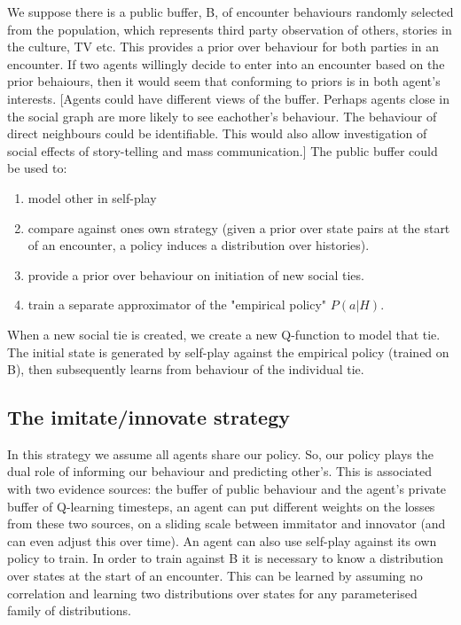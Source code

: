 \documentclass[a4paper]{report}
\begin{document}
We suppose there is a public buffer, B, of encounter behaviours randomly selected from the population, which represents third party observation of others, stories in the culture, TV etc. This provides a prior over behaviour for both parties in an encounter. If two agents willingly decide to enter into an encounter based on the prior behaiours, then it would seem that conforming to priors is in both agent's interests. [Agents could have different views of the buffer. Perhaps agents close in the social graph are more likely to see eachother's behaviour. The behaviour of direct neighbours could be identifiable. This would also allow investigation of social effects of story-telling and mass communication.] The public buffer could be used to:
\begin{enumerate}
	\item  model other in self-play
	
	\item compare against ones own strategy (given a prior over state pairs at the start of an encounter, a policy induces a distribution over histories). 
	
	\item provide a prior over behaviour on initiation of new social ties.
	
	\item train a separate approximator of the "empirical policy" $P(a|H)$. 
	
\end{enumerate}

When a new social tie is created, we create a new Q-function to model that tie. The initial state is generated by self-play against the empirical policy (trained on B), then subsequently learns from behaviour of the individual tie.

\subsection{The imitate/innovate strategy}

In this strategy we assume all agents share our policy. So, our policy plays the dual role of informing our behaviour and predicting other's. This is associated with two evidence sources: the buffer of public behaviour and the agent's private buffer of Q-learning timesteps, an agent can put different weights on the losses from these two sources, on a sliding scale between immitator and innovator (and can even adjust this over time). An agent can also use self-play against its own policy to train. In order to train against B it is necessary to know a distribution over states at the start of an encounter. This can be learned by assuming no correlation and learning two distributions over states for any parameterised family of distributions.
\end{document}
